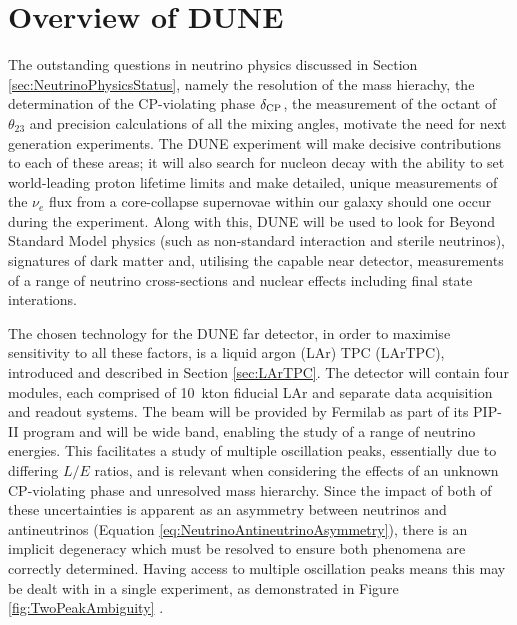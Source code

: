 \section{Overview of DUNE}\label{sec:DUNEOverview}

The outstanding questions in neutrino physics discussed in Section \ref{sec:NeutrinoPhysicsStatus}, namely the resolution of the mass hierachy, the determination of the CP-violating phase $\delta_{\textnormal{CP}}$, the measurement of the octant of $\theta_{23}$ and precision calculations of all the mixing angles, motivate the need for next generation experiments.  The DUNE experiment will make decisive contributions to each of these areas; it will also search for nucleon decay with the ability to set world-leading proton lifetime limits and make detailed, unique measurements of the $\nu_e$ flux from a core-collapse supernovae within our galaxy should one occur during the experiment.  Along with this, DUNE will be used to look for Beyond Standard Model physics (such as non-standard interaction and sterile neutrinos), signatures of dark matter and, utilising the capable near detector, measurements of a range of neutrino cross-sections and nuclear effects including final state interations.

The chosen technology for the DUNE far detector, in order to maximise sensitivity to all these factors, is a liquid argon (LAr) TPC (LArTPC), introduced and described in Section \ref{sec:LArTPC}.  The detector will contain four modules, each comprised of 10~kton fiducial LAr and separate data acquisition and readout systems.  The beam will be provided by Fermilab as part of its PIP-II program \cite{} and will be wide band, enabling the study of a range of neutrino energies.  This facilitates a study of multiple oscillation peaks, essentially due to differing $L/E$ ratios, and is relevant when considering the effects of an unknown CP-violating phase and unresolved mass hierarchy.  Since the impact of both of these uncertainties is apparent as an asymmetry between neutrinos and antineutrinos (Equation \ref{eq:NeutrinoAntineutrinoAsymmetry}), there is an implicit degeneracy which must be resolved to ensure both phenomena are correctly determined.  Having access to multiple oscillation peaks means this may be dealt with in a single experiment, as demonstrated in Figure \ref{fig:TwoPeakAmbiguity} \cite{Huber2011}.

